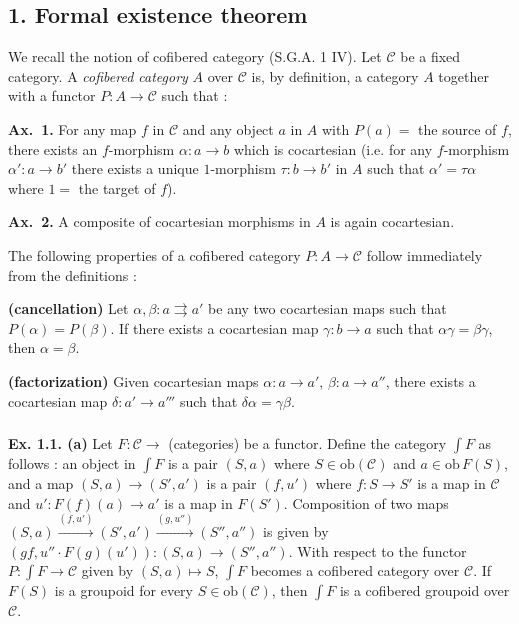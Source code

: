 \documentclass[11pt]{article}
\theoremstyle{plain}
\theoremstyle{definition}
\theoremstyle{remark}
\begin{document}
\subsection*{1. Formal existence theorem}

We recall the notion of cofibered category (S.G.A. 1 IV). Let $\mathcal{C}$ be a fixed category. A \emph{cofibered category} $A$ over $\mathcal{C}$ is, by definition, a category $A$ together with a functor $P: A \to \mathcal{C}$ such that :

\textbf{Ax.~1.} For any map $f$ in $\mathcal{C}$ and any object $a$ in $A$ with $P(a) =$ the source of $f$, there exists an $f$-morphism $\alpha: a \to b$ which is cocartesian (i.e. for any $f$-morphism $\alpha': a \to b'$ there exists a unique $1$-morphism $\tau: b \to b'$ in $A$ such that $\alpha' = \tau \alpha$ where $1 =$ the target of $f$).

\textbf{Ax.~2.} A composite of cocartesian morphisms in $A$ is again cocartesian.

The following properties of a cofibered category $P: A \to \mathcal{C}$ follow immediately from the definitions :

\textbf{(cancellation)} Let $\alpha, \beta: a \rightrightarrows a'$ be any two cocartesian maps such that $P(\alpha) = P(\beta)$. If there exists a cocartesian map $\gamma: b \to a$ such that $\alpha\gamma = \beta\gamma$, then $\alpha = \beta$.

\textbf{(factorization)} Given cocartesian maps $\alpha: a \to a'$, $\beta: a \to a''$, there exists a cocartesian map $\delta: a' \to a'''$ such that $\delta\alpha = \gamma\beta$.

\subsubsection{}
\textbf{Ex. 1.1. (a)} Let $F: \mathcal{C} \to$ (categories) be a functor. Define the category $\int F$ as follows : an object in $\int F$ is a pair $(S, a)$ where $S \in \mathrm{ob}(\mathcal{C})$ and $a \in \mathrm{ob}\,F(S)$, and a map $(S, a) \to (S', a')$ is a pair $(f, u')$ where $f: S \to S'$ is a map in $\mathcal{C}$ and $u': F(f)(a) \to a'$ is a map in $F(S')$. Composition of two maps $(S, a) \xrightarrow{(f, u')} (S', a') \xrightarrow{(g, u'')} (S'', a'')$ is given by $(gf, u'' \cdot F(g)(u')): (S, a) \to (S'', a'')$. With respect to the functor $P: \int F \to \mathcal{C}$ given by $(S, a) \mapsto S$, $\int F$ becomes a cofibered category over $\mathcal{C}$. If $F(S)$ is a groupoid for every $S \in \mathrm{ob}(\mathcal{C})$, then $\int F$ is a cofibered groupoid over $\mathcal{C}$.
\end{document}
